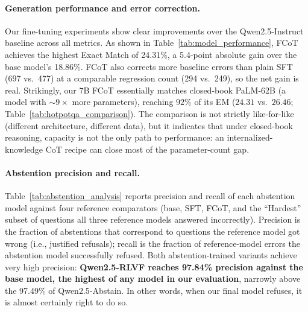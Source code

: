 \documentclass[11pt]{article}
\begin{document}
\paragraph{Generation performance and error correction.}
Our fine-tuning experiments show clear improvements over the Qwen2.5-Instruct baseline across all metrics. As shown in Table~\ref{tab:model_performance}, FCoT achieves the highest Exact Match of 24.31\%, a 5.4-point absolute gain over the base model's 18.86\%. FCoT also corrects more baseline errors than plain SFT (697 vs.\ 477) at a comparable regression count (294 vs.\ 249), so the net gain is real. Strikingly, our $7$B FCoT essentially matches closed-book PaLM-62B (a model with $\sim 9\times$ more parameters), reaching $92\%$ of its EM ($24.31$ vs.\ $26.46$; Table~\ref{tab:hotpotqa_comparison}). The comparison is not strictly like-for-like (different architecture, different data), but it indicates that under closed-book reasoning, capacity is not the only path to performance: an internalized-knowledge CoT recipe can close most of the parameter-count gap.

\paragraph{Abstention precision and recall.}
Table~\ref{tab:abstention_analysis} reports precision and recall of each abstention model against four reference comparators (base, SFT, FCoT, and the ``Hardest'' subset of questions all three reference models answered incorrectly). Precision is the fraction of abstentions that correspond to questions the reference model got wrong (i.e., justified refusals); recall is the fraction of reference-model errors the abstention model successfully refused. Both abstention-trained variants achieve very high precision: \textbf{Qwen2.5-RLVF reaches 97.84\% precision against the base model, the highest of any model in our evaluation}, narrowly above the 97.49\% of Qwen2.5-Abstain. In other words, when our final model refuses, it is almost certainly right to do so.
\end{document}

